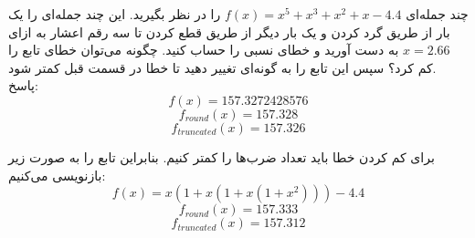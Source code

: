 چند جمله‌ای $f(x) = x^5 + x^3 + x^2 + x - 4.4$ را در نظر بگیرید. این چند جمله‌ای را یک بار از طریق گرد کردن و یک بار دیگر از طریق قطع کردن تا سه رقم اعشار به ازای $x = 2.66$ به دست آورید و خطای نسبی را حساب کنید. چگونه می‌توان خطای تابع را کم کرد؟ سپس این تابع را به گونه‌ای تغییر دهید تا خطا در قسمت قبل کمتر شود.\\


پاسخ:\\
$$f(x) = 157.3272428576$$
$$f_{round}(x) = 157.328$$
$$f_{truncated}(x) = 157.326$$


برای کم کردن خطا باید تعداد ضرب‌ها را کمتر کنیم. بنابراین تابع را به صورت زیر بازنویسی می‌کنیم:\\

$$f(x) = x (1 + x (1 + x (1 + x^2))) - 4.4$$
$$f_{round}(x) = 157.333$$
$$f_{truncated}(x) = 157.312$$